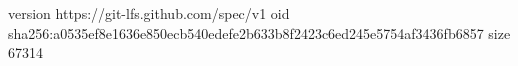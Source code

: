 version https://git-lfs.github.com/spec/v1
oid sha256:a0535ef8e1636e850ecb540edefe2b633b8f2423c6ed245e5754af3436fb6857
size 67314
